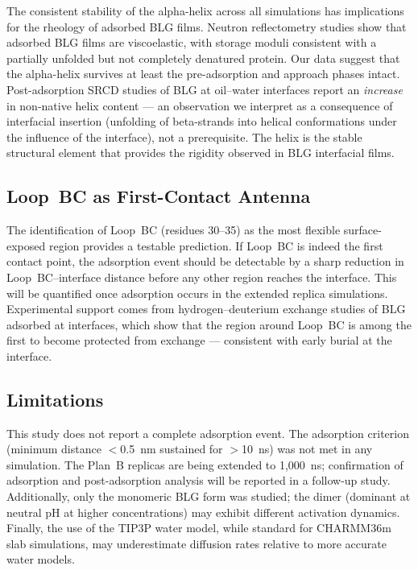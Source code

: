 \documentclass[journal=langd5,manuscript=article]{achemso}
\begin{document}
The consistent stability of the alpha-helix across all simulations has
implications for the rheology of adsorbed BLG films. Neutron reflectometry
studies\cite{Ulaganathan2019} show that adsorbed BLG films are viscoelastic,
with storage moduli consistent with a partially unfolded but not completely
denatured protein. Our data suggest that the alpha-helix survives at least
the pre-adsorption and approach phases intact. Post-adsorption SRCD studies
of BLG at oil--water interfaces report an \emph{increase} in non-native helix
content --- an observation we interpret as a consequence of interfacial
insertion (unfolding of beta-strands into helical conformations under the
influence of the interface), not a prerequisite. The helix is the stable
structural element that provides the rigidity observed in BLG interfacial
films.

\subsection{Loop~BC as First-Contact Antenna}

The identification of Loop~BC (residues 30--35) as the most flexible
surface-exposed region provides a testable prediction. If Loop~BC is indeed
the first contact point, the adsorption event should be detectable by a
sharp reduction in Loop~BC--interface distance before any other region reaches
the interface. This will be quantified once adsorption occurs in the
extended replica simulations. Experimental support comes from hydrogen--deuterium
exchange studies of BLG adsorbed at interfaces, which show that the region
around Loop~BC is among the first to become protected from exchange ---
consistent with early burial at the interface.

\subsection{Limitations}

This study does not report a complete adsorption event. The adsorption criterion
(minimum distance $<$0.5~nm sustained for $>$10~ns) was not met in any
simulation. The Plan~B replicas are being extended to 1{,}000~ns; confirmation
of adsorption and post-adsorption analysis will be reported in a follow-up
study. Additionally, only the monomeric BLG form was studied; the dimer
(dominant at neutral pH at higher concentrations) may exhibit different
activation dynamics. Finally, the use of the TIP3P water model, while
standard for CHARMM36m slab simulations, may underestimate diffusion rates
relative to more accurate water models.
\end{document}
